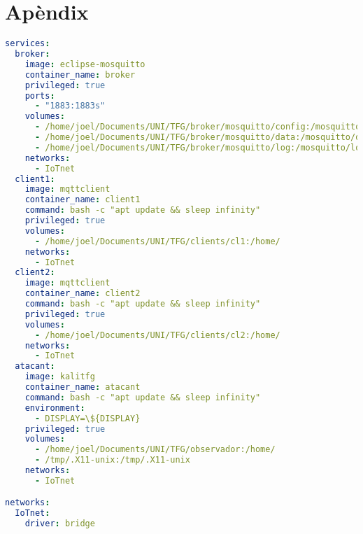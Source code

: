 \chapter{Apèndix}

\begin{lstlisting}[language=yaml, caption={Desplegament de la xarxa totalment simulada}, label=code:exemple]
services:
  broker:
    image: eclipse-mosquitto
    container_name: broker
    privileged: true
    ports:
      - "1883:1883s"
    volumes:
      - /home/joel/Documents/UNI/TFG/broker/mosquitto/config:/mosquitto/config
      - /home/joel/Documents/UNI/TFG/broker/mosquitto/data:/mosquitto/data
      - /home/joel/Documents/UNI/TFG/broker/mosquitto/log:/mosquitto/log
    networks:
      - IoTnet
  client1:
    image: mqttclient
    container_name: client1
    command: bash -c "apt update && sleep infinity"
    privileged: true
    volumes:
      - /home/joel/Documents/UNI/TFG/clients/cl1:/home/
    networks:
      - IoTnet
  client2:
    image: mqttclient
    container_name: client2
    command: bash -c "apt update && sleep infinity"
    privileged: true
    volumes:
      - /home/joel/Documents/UNI/TFG/clients/cl2:/home/
    networks:
      - IoTnet
  atacant:
    image: kalitfg
    container_name: atacant
    command: bash -c "apt update && sleep infinity"
    environment:
      - DISPLAY=\${DISPLAY}
    privileged: true
    volumes:
      - /home/joel/Documents/UNI/TFG/observador:/home/
      - /tmp/.X11-unix:/tmp/.X11-unix
    networks:
      - IoTnet

networks:
  IoTnet:
    driver: bridge

\end{lstlisting}

